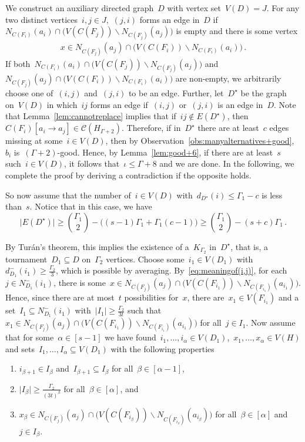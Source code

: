 \documentclass[oneside, 12pt]{amsart}
\numberwithin{equation}{section}
\numberwithin{figure}{section}
\let\setminus=\smallsetminus
\newcommand{\cC}{\mathcal{C}}
\theoremstyle{plain}
\theoremstyle{note}
\theoremstyle{remark}
\begin{document}
    We construct an auxiliary directed graph~$D$ with vertex set~$V(D)=J$.
	For any two distinct vertices~$i,j\in J$,~$(j,i)$ forms an edge in~$D$ if~$N_{C(F_i)}(a_i)\cap \big(V(C(F_j))\setminus N_{C(F_j)}(a_j)\big)$ is empty and there is some vertex
    \begin{align}\label{eq:meaningof(i,j)}
        x\in N_{C(F_j)}(a_j)\cap \big(V(C(F_i))\setminus N_{C(F_i)}(a_i)\big)\,.
    \end{align}
    If both~$N_{C(F_i)}(a_i)\cap \big(V(C(F_j))\setminus N_{C(F_j)}(a_j)\big)$ and~$N_{C(F_j)}(a_j)\cap \big(V(C(F_i))\setminus N_{C(F_i)}(a_i)\big)$ are non-empty, we arbitrarily choose one of~$(i,j)$ and~$(j,i)$ to be an edge.
    Further, let~$D^{\star}$ be the graph on~$V(D)$ in which~$ij$ forms an edge if~$(i,j)$ or~$(j,i)$ is an edge in~$D$.
    Note that Lemma~\ref{lem:cannotreplace} implies that if~$ij\notin E(D^{\star})$, then~$C(F_i)[a_i \to a_j]\in\cC(H_{\Gamma+2})$.
    Therefore, if in~$D^{\star}$ there are at least~$c$ edges missing at some~$i\in V(D)$, then by Observation~\ref{obs:manyalternatives+good},~$b_i$ is~$(\Gamma+2)$-good.
    Hence, by Lemma~\ref{lem:good+6}, if there are at least~$s$ such~$i\in V(D)$, it follows that~$\iota\leq\Gamma+8$ and we are done.
    In the following, we complete the proof by deriving a contradiction if the opposite holds.
    
    So now assume that the number of~$i\in V(D)$ with~$d_{D^{\star}}(i)\leq \Gamma_1-c$ is less than~$s$.
    Notice that in this case, we have $$\vert E(D^{\star})\vert\geq\binom{\Gamma_1}{2}-\big((s-1)\Gamma_1 + \Gamma_1(c-1)\big) \geq \binom{\Gamma_1}{2}-(s+c)\Gamma_1\,.$$
    
	By Turán’s theorem, this implies the existence of a~$K_{\Gamma_2}$ in~$D^{\star}$, that is, a tournament~$D_1\subseteq D$ on~$\Gamma_2$ vertices.
    Choose some~$i_1\in V(D_1)$ with~$d^{-}_{D_1}(i_1)\geq \frac{\Gamma_2}{3}$, which is possible by averaging.
    By~\eqref{eq:meaningof(i,j)}, for each~$j\in N^{-}_{D_1}(i_1)$, there is some~$x\in N_{C(F_j)}(a_j)\cap \big(V(C(F_{i_1}))\setminus N_{C(F_{i_1})}(a_{i_1})\big)$.
    Hence, since there are at most~$t$ possibilities for~$x$, there are~$x_1\in V(F_{i_1})$ and a set~$I_1\subseteq N^{-}_{D_1}(i_1)$ with~$\vert I_1\vert\geq\frac{\Gamma_2}{3t}$ such that~$x_1\in N_{C(F_j)}(a_j)\cap \big(V(C(F_{i_1}))\setminus N_{C(F_{i_1})}(a_{i_1})\big)$ for all~$j\in I_1$.
    Now assume that for some~$\alpha\in[s-1]$ we have found~$i_1,\dots,i_{\alpha}\in V(D_1)$,~$x_1,\dots,x_{\alpha}\in V(H)$ and sets~$I_1,\dots,I_{\alpha}\subseteq V(D_1)$ with the following properties
    \begin{enumerate}
        \item\label{it:nested} $i_{\beta+1}\in I_{\beta}$ and~$I_{\beta+1}\subseteq I_{\beta}$ for all~$\beta\in[\alpha-1]$,
        \item\label{it:size indeg} $\vert I_{\beta}\vert\geq\frac{\Gamma_2}{(3t)^{\beta}}$ for all~$\beta\in[\alpha]$, and
        \item\label{it:vertexcontainment} $x_{\beta}\in N_{C(F_j)}(a_j)\cap\big(V(C(F_{i_{\beta}}))\setminus N_{C(F_{i_{\beta}})}(a_{i_{\beta}})\big)$ for all~$\beta\in[\alpha]$ and~$j\in I_{\beta}$.
    \end{enumerate}
\end{document}

